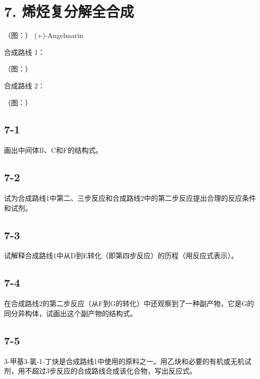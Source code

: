 \section*{7. 烯烃复分解全合成}
（图：）
(+)-Angelmarin

合成路线 1：

（图：）

合成路线 2：

（图：）

\subsection*{7-1}
画出中间体B、C和F的结构式。

\subsection*{7-2}
试为合成路线1中第⼆、三步反应和合成路线2中的第⼆步反应提出合理的反应条件和试剂。

\subsection*{7-3}
试解释合成路线1中从D到E转化（即第四步反应）的历程（⽤反应式表⽰）。

\subsection*{7-4}
在合成路线2的第⼆步反应（从F到G的转化）中还观察到了⼀种副产物，它是G的同分异构体，试画出这个副产物的结构式。

\subsection*{7-5}
3-甲基3-氯-1-丁炔是合成路线1中使⽤的原料之⼀。⽤⼄炔和必要的有机或⽆机试剂，⽤不超过3步反应的合成路线合成该化合物，写出反应式。
